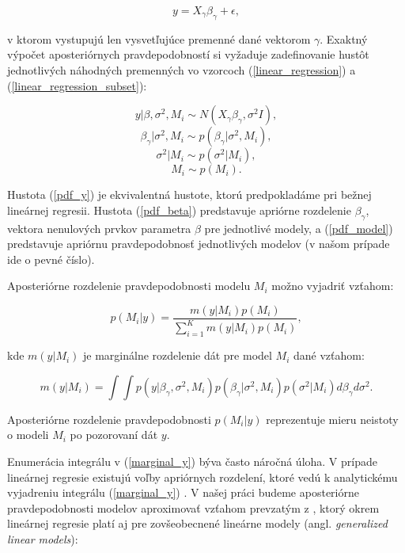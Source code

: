 \begin{equation} \label{linear_regression_subset}
y = X_{\gamma} \beta_{\gamma} + \epsilon,
\end{equation}

v ktorom vystupujú len vysvetľujúce premenné dané vektorom \( \gamma \).
Exaktný výpočet aposteriórnych pravdepodobností si vyžaduje zadefinovanie hustôt jednotlivých náhodných premenných vo vzorcoch (\ref{linear_regression}) a (\ref{linear_regression_subset}):

\begin{equation} \label{pdf_y}
    y | \beta, \sigma^2, M_i \sim N(X_{\gamma} \beta_{\gamma}, \sigma^2 I),
\end{equation}
\begin{equation} \label{pdf_beta}
    \beta_{\gamma} | \sigma^2, M_i \sim p(\beta_{\gamma} | \sigma^2, M_i),
\end{equation}
\[
    \sigma^2 | M_i \sim p(\sigma^2 | M_i),
\]
\begin{equation} \label{pdf_model}
    M_i \sim p(M_i).
\end{equation}

Hustota (\ref{pdf_y}) je ekvivalentná hustote, ktorú predpokladáme pri bežnej lineárnej regresii.
Hustota (\ref{pdf_beta}) predstavuje apriórne rozdelenie \( \beta_{\gamma}\), vektora nenulových prvkov parametra \(\beta\) pre jednotlivé modely,
a (\ref{pdf_model}) predstavuje apriórnu pravdepodobnosť jednotlivých modelov (v našom prípade ide o pevné číslo).

Aposteriórne rozdelenie pravdepodobnosti modelu \(M_i\) možno vyjadriť vzťahom:

\[
    p(M_i | y) = \frac{m(y | M_i) p(M_i)}{\sum_{i = 1}^{K} m(y | M_i) p(M_i)},
\]

kde \( m(y | M_i) \) je marginálne rozdelenie dát pre model \(M_i\) dané vzťahom:

\begin{equation} \label{marginal_y}
    m(y | M_i) = \int \int p(y | \beta_{\gamma}, \sigma^2, M_i) p(\beta_{\gamma} | \sigma^2, M_i) p(\sigma^2 | M_i) d\beta_{\gamma} d\sigma^2.
\end{equation}

Aposteriórne rozdelenie pravdepodobnosti \( p(M_i | y) \) reprezentuje mieru neistoty o modeli \(M_i\) po pozorovaní dát \(y\).

Enumerácia integrálu v (\ref{marginal_y}) býva často náročná úloha.
V prípade lineárnej regresie existujú voľby apriórnych rozdelení, ktoré vedú k analytickému vyjadreniu integrálu (\ref{marginal_y}) \cite{mcculloch}.
V našej práci budeme aposteriórne pravdepodobnosti modelov aproximovať vzťahom prevzatým z \cite{jamespress},
ktorý okrem lineárnej regresie platí aj pre zovšeobecnené lineárne modely (angl. \emph{generalized linear models}):

